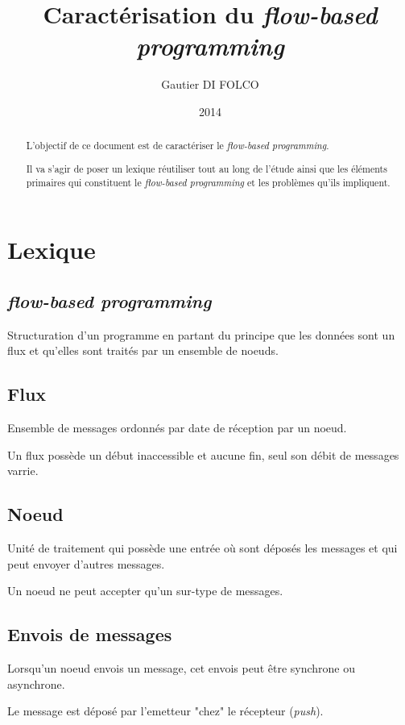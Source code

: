 \documentclass{article}
\title{Caractérisation du \emph{flow-based programming}}
\author{Gautier DI FOLCO}
\date{2014}
\begin{document}
\maketitle
\tableofcontents

\begin{abstract}
L'objectif de ce document est de caractériser le \emph{flow-based programming}.

Il va s'agir de poser un lexique réutiliser tout au long de l'étude ainsi que les
éléments primaires qui constituent le \emph{flow-based programming} et les problèmes
qu'ils impliquent.
\end{abstract}

\section{Lexique}
\subsection{\emph{flow-based programming}}
Structuration d'un programme en partant du principe que les données sont un flux
et qu'elles sont traités par un ensemble de noeuds.

\subsection{Flux}
Ensemble de messages ordonnés par date de réception par un noeud.

Un flux possède un début inaccessible et aucune fin, seul son débit de messages
varrie.

\subsection{Noeud}
Unité de traitement qui possède une entrée où sont déposés les messages et qui
peut envoyer d'autres messages.

Un noeud ne peut accepter qu'un sur-type de messages.

\subsection{Envois de messages}
Lorsqu'un noeud envois un message, cet envois peut être synchrone ou asynchrone.

Le message est déposé par l'emetteur "chez" le récepteur (\emph{push}).
\end{document}
